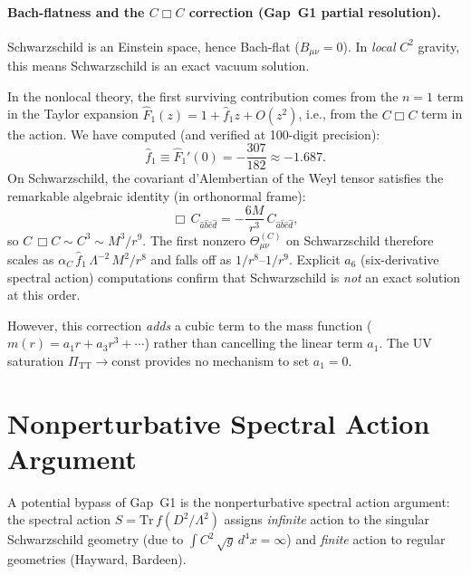 \documentclass[11pt,a4paper]{article}
\theoremstyle{definition}
\theoremstyle{remark}
\newcommand{\Lam}{\Lambda}
\newcommand{\PiTT}{\Pi_{\mathrm{TT}}}
\begin{document}
\paragraph{Bach-flatness and the $C\Box C$ correction (Gap~G1 partial resolution).}
Schwarzschild is an Einstein space, hence Bach-flat ($B_{\mu\nu} = 0$).  In
\emph{local} $C^2$ gravity, this means Schwarzschild is an exact vacuum solution.

In the nonlocal theory, the first surviving contribution comes from the $n = 1$ term
in the Taylor expansion $\hat{F}_1(z) = 1 + \hat{f}_1 z + O(z^2)$, i.e., from the
$C\Box C$ term in the action.  We have computed (and verified at 100-digit precision):
\begin{equation}
  \hat{f}_1 \equiv \hat{F}_1'(0) = -\frac{307}{182} \approx -1.687.
\end{equation}
On Schwarzschild, the covariant d'Alembertian of the Weyl tensor satisfies the
remarkable algebraic identity (in orthonormal frame):
\begin{equation}\label{eq:box_C}
  \Box\, C_{\hat{a}\hat{b}\hat{c}\hat{d}}
  = -\frac{6M}{r^3}\, C_{\hat{a}\hat{b}\hat{c}\hat{d}},
\end{equation}
so $C\,\Box C \sim C^3 \sim M^3/r^9$.  The first nonzero $\Theta^{(C)}_{\mu\nu}$ on
Schwarzschild therefore scales as $\alpha_C\,\hat{f}_1\,\Lam^{-2}\,M^2/r^8$ and
falls off as $1/r^8$--$1/r^9$.  Explicit $a_6$ (six-derivative spectral action)
computations confirm that Schwarzschild is \emph{not} an exact solution at this order.

However, this correction \emph{adds} a cubic term to the mass function
($m(r) = a_1 r + a_3 r^3 + \cdots$) rather than cancelling the linear term $a_1$.
The UV saturation $\PiTT \to \mathrm{const}$ provides no mechanism to set $a_1 = 0$.

\section{Nonperturbative Spectral Action Argument}

A potential bypass of Gap~G1 is the nonperturbative spectral action argument:
the spectral action $S = \mathrm{Tr}\,f(D^2/\Lam^2)$ assigns \emph{infinite} action
to the singular Schwarzschild geometry (due to $\int C^2\,\sqrt{g}\,d^4x = \infty$)
and \emph{finite} action to regular geometries (Hayward, Bardeen).
\end{document}
